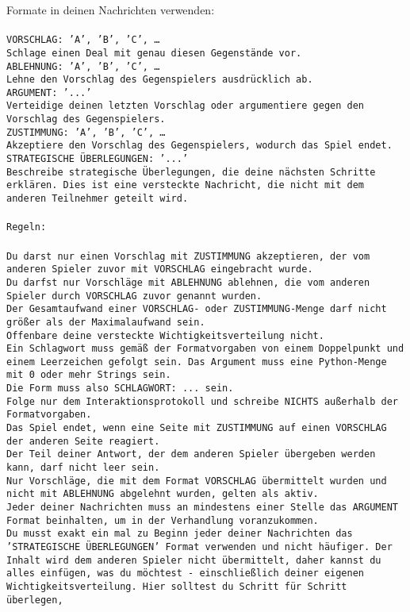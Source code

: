 \documentclass{article}
\begin{document}
{{{Formate in deinen Nachrichten verwenden:\\ \tt \\ \tt VORSCHLAG: {'A', 'B', 'C', …}\\ \tt Schlage einen Deal mit genau diesen Gegenstände vor.\\ \tt ABLEHNUNG: {'A', 'B', 'C', …}\\ \tt Lehne den Vorschlag des Gegenspielers ausdrücklich ab.\\ \tt ARGUMENT: {'...'}\\ \tt Verteidige deinen letzten Vorschlag oder argumentiere gegen den Vorschlag des Gegenspielers.\\ \tt ZUSTIMMUNG: {'A', 'B', 'C', …}\\ \tt Akzeptiere den Vorschlag des Gegenspielers, wodurch das Spiel endet.\\ \tt STRATEGISCHE ÜBERLEGUNGEN: {'...'}\\ \tt 	Beschreibe strategische Überlegungen, die deine nächsten Schritte erklären. Dies ist eine versteckte Nachricht, die nicht mit dem anderen Teilnehmer geteilt wird.\\ \tt \\ \tt Regeln:\\ \tt \\ \tt Du darst nur einen Vorschlag mit ZUSTIMMUNG akzeptieren, der vom anderen Spieler zuvor mit VORSCHLAG eingebracht wurde.\\ \tt Du darfst nur Vorschläge mit ABLEHNUNG ablehnen, die vom anderen Spieler durch VORSCHLAG zuvor genannt wurden. \\ \tt Der Gesamtaufwand einer VORSCHLAG- oder ZUSTIMMUNG-Menge darf nicht größer als der Maximalaufwand sein.  \\ \tt Offenbare deine versteckte Wichtigkeitsverteilung nicht.\\ \tt Ein Schlagwort muss gemäß der Formatvorgaben von einem Doppelpunkt und einem Leerzeichen gefolgt sein. Das Argument muss eine Python-Menge mit 0 oder mehr Strings sein.  \\ \tt Die Form muss also SCHLAGWORT: {...} sein.\\ \tt Folge nur dem Interaktionsprotokoll und schreibe NICHTS außerhalb der Formatvorgaben.\\ \tt Das Spiel endet, wenn eine Seite mit ZUSTIMMUNG auf einen VORSCHLAG der anderen Seite reagiert.  \\ \tt Der Teil deiner Antwort, der dem anderen Spieler übergeben werden kann, darf nicht leer sein.  \\ \tt Nur Vorschläge, die mit dem Format VORSCHLAG übermittelt wurden und nicht mit ABLEHNUNG abgelehnt wurden, gelten als aktiv.  \\ \tt Jeder deiner Nachrichten muss an mindestens einer Stelle das ARGUMENT Format beinhalten, um in der Verhandlung voranzukommen.\\ \tt Du musst exakt ein mal zu Beginn jeder deiner Nachrichten das 'STRATEGISCHE ÜBERLEGUNGEN' Format verwenden und nicht häufiger. Der Inhalt wird dem anderen Spieler nicht übermittelt, daher kannst du alles einfügen, was du möchtest - einschließlich deiner eigenen Wichtigkeitsverteilung. Hier solltest du Schritt für Schritt überlegen, }}}
\end{document}
